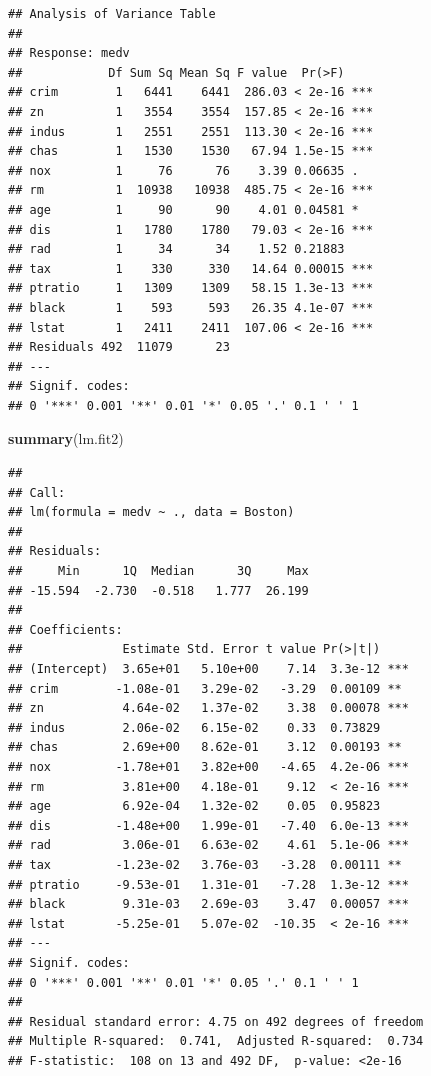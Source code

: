 \documentclass[]{book}
\newenvironment{Shaded}{\begin{snugshade}}{\end{snugshade}}
\newcommand{\KeywordTok}[1]{\textcolor[rgb]{0.13,0.29,0.53}{\textbf{#1}}}
\newcommand{\NormalTok}[1]{#1}
\theoremstyle{definition}
\theoremstyle{definition}
\theoremstyle{definition}
\theoremstyle{remark}
\begin{document}
\begin{verbatim}
## Analysis of Variance Table
## 
## Response: medv
##            Df Sum Sq Mean Sq F value  Pr(>F)    
## crim        1   6441    6441  286.03 < 2e-16 ***
## zn          1   3554    3554  157.85 < 2e-16 ***
## indus       1   2551    2551  113.30 < 2e-16 ***
## chas        1   1530    1530   67.94 1.5e-15 ***
## nox         1     76      76    3.39 0.06635 .  
## rm          1  10938   10938  485.75 < 2e-16 ***
## age         1     90      90    4.01 0.04581 *  
## dis         1   1780    1780   79.03 < 2e-16 ***
## rad         1     34      34    1.52 0.21883    
## tax         1    330     330   14.64 0.00015 ***
## ptratio     1   1309    1309   58.15 1.3e-13 ***
## black       1    593     593   26.35 4.1e-07 ***
## lstat       1   2411    2411  107.06 < 2e-16 ***
## Residuals 492  11079      23                    
## ---
## Signif. codes:  
## 0 '***' 0.001 '**' 0.01 '*' 0.05 '.' 0.1 ' ' 1
\end{verbatim}

\begin{Shaded}
\begin{Highlighting}[]
\KeywordTok{summary}\NormalTok{(lm.fit2)}
\end{Highlighting}
\end{Shaded}

\begin{verbatim}
## 
## Call:
## lm(formula = medv ~ ., data = Boston)
## 
## Residuals:
##     Min      1Q  Median      3Q     Max 
## -15.594  -2.730  -0.518   1.777  26.199 
## 
## Coefficients:
##              Estimate Std. Error t value Pr(>|t|)    
## (Intercept)  3.65e+01   5.10e+00    7.14  3.3e-12 ***
## crim        -1.08e-01   3.29e-02   -3.29  0.00109 ** 
## zn           4.64e-02   1.37e-02    3.38  0.00078 ***
## indus        2.06e-02   6.15e-02    0.33  0.73829    
## chas         2.69e+00   8.62e-01    3.12  0.00193 ** 
## nox         -1.78e+01   3.82e+00   -4.65  4.2e-06 ***
## rm           3.81e+00   4.18e-01    9.12  < 2e-16 ***
## age          6.92e-04   1.32e-02    0.05  0.95823    
## dis         -1.48e+00   1.99e-01   -7.40  6.0e-13 ***
## rad          3.06e-01   6.63e-02    4.61  5.1e-06 ***
## tax         -1.23e-02   3.76e-03   -3.28  0.00111 ** 
## ptratio     -9.53e-01   1.31e-01   -7.28  1.3e-12 ***
## black        9.31e-03   2.69e-03    3.47  0.00057 ***
## lstat       -5.25e-01   5.07e-02  -10.35  < 2e-16 ***
## ---
## Signif. codes:  
## 0 '***' 0.001 '**' 0.01 '*' 0.05 '.' 0.1 ' ' 1
## 
## Residual standard error: 4.75 on 492 degrees of freedom
## Multiple R-squared:  0.741,  Adjusted R-squared:  0.734 
## F-statistic:  108 on 13 and 492 DF,  p-value: <2e-16
\end{verbatim}
\end{document}
